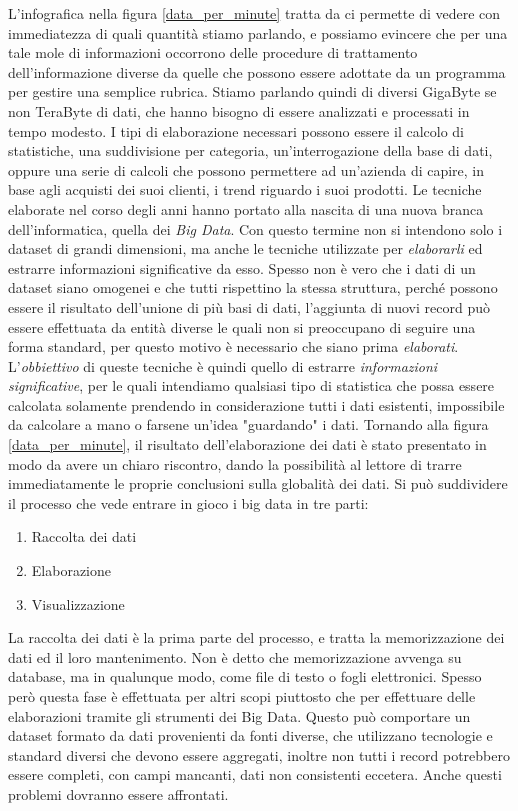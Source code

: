 L'infografica nella figura \ref{data_per_minute} tratta da \cite{data_per_minute} ci permette di vedere con immediatezza di quali quantità stiamo parlando, e possiamo evincere che per una tale mole di informazioni occorrono delle procedure di trattamento dell'informazione diverse da quelle che possono essere adottate da un programma per gestire una semplice rubrica. Stiamo parlando quindi di diversi GigaByte se non TeraByte di dati, che hanno bisogno di essere analizzati e processati in tempo modesto. I tipi di elaborazione necessari possono essere il calcolo di statistiche, una suddivisione per categoria, un'interrogazione della base di dati, oppure una serie di calcoli che possono permettere ad un'azienda di capire, in base agli acquisti dei suoi clienti, i trend riguardo i suoi prodotti. Le tecniche elaborate nel corso degli anni hanno portato alla nascita di una nuova branca dell'informatica, quella dei \emph{Big Data}. Con questo termine non si intendono solo i dataset di grandi dimensioni, ma anche le tecniche utilizzate per \emph{elaborarli} ed estrarre informazioni significative da esso. Spesso non è vero che i dati di un dataset siano omogenei e che tutti rispettino la stessa struttura, perché possono essere il risultato dell'unione di più basi di dati, l'aggiunta di nuovi record può essere effettuata da entità diverse le quali non si preoccupano di seguire una forma standard, per questo motivo è necessario che siano prima \emph{elaborati}. L'\emph{obbiettivo} di queste tecniche è quindi quello di estrarre \emph{informazioni significative}, per le quali intendiamo qualsiasi tipo di statistica che possa essere calcolata solamente prendendo in considerazione tutti i dati esistenti, impossibile da calcolare a mano o farsene un'idea "guardando" i dati. Tornando alla figura \ref{data_per_minute}, il risultato dell'elaborazione dei dati è stato presentato in modo da avere un chiaro riscontro, dando la possibilità al lettore di trarre immediatamente le proprie conclusioni sulla globalità dei dati.
Si può suddividere il processo che vede entrare in gioco i big data in tre parti:
\begin{enumerate}
\item Raccolta dei dati
\item Elaborazione
\item Visualizzazione
\end{enumerate}
La raccolta dei dati è la prima parte del processo, e tratta la memorizzazione dei dati ed il loro mantenimento. Non è detto che memorizzazione avvenga su database, ma in qualunque modo, come file di testo o fogli elettronici. Spesso però questa fase è effettuata per altri scopi piuttosto che per effettuare delle elaborazioni tramite gli strumenti dei Big Data. Questo può comportare un dataset formato da dati provenienti da fonti diverse, che utilizzano tecnologie e standard diversi che devono essere aggregati, inoltre non tutti i record potrebbero essere completi, con campi mancanti, dati non consistenti eccetera. Anche questi problemi dovranno essere affrontati.
